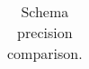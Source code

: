\begin{table}
{\begin{tabular}{lc@{\hs}rrc@{\s}rrc@{\s}rrc@{\s}rrc@{\s}rrc@{\s}rr}
\bottomrule
\end{tabular}
}
\caption{Schema precision comparison.}
\label{tab:precision-schema}
\end{table}
